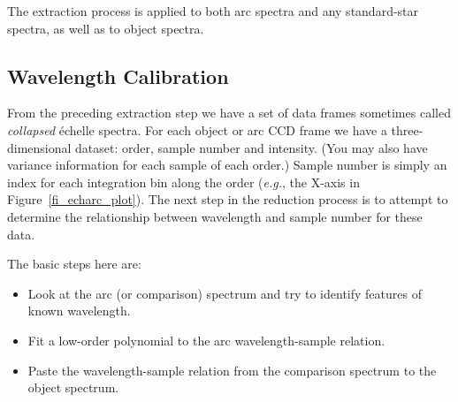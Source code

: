 \documentclass[twoside,11pt]{article}
\newcommand{\xlabel}[1]{}
\newcommand{\sgspec}[2]{#1}
\newcommand{\sgspec}[2]{#2}
\begin{document}
The extraction process is applied to both arc spectra and any
standard-star spectra, as well as to object spectra.


\subsection{\label{se_wavelen_cal}\xlabel{wavelen_cal}Wavelength Calibration}

From the preceding extraction step we have a set of data frames
sometimes called {\sl collapsed} \'{e}chelle spectra.  For each object
or arc CCD frame we have a three-dimensional dataset: order, sample
number and intensity.  (You may also have variance information for each
sample of each order.)  Sample number is simply an index for each
integration bin along the order ({\em{e.g.}}, the X-axis in
\sgspec{Figure~\ref{fi_echarc_plot}}{the figure below}).
The next step in the reduction process is to attempt to determine the
relationship between wavelength and sample number for these data.

The basic steps here are:

\begin{itemize}

\item Look at the arc (or comparison) spectrum and try to identify
      features of known wavelength.

\item Fit a low-order polynomial to the arc wavelength-sample relation.

\item Paste the wavelength-sample relation from the comparison spectrum
      to the object spectrum.

\end{itemize}
\end{document}
